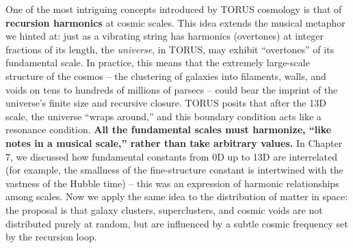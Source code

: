 \documentclass[
]{article}
\begin{document}
One of the most intriguing concepts introduced by TORUS cosmology is
that of \textbf{recursion harmonics} at cosmic scales. This idea extends
the musical metaphor we hinted at: just as a vibrating string has
harmonics (overtones) at integer fractions of its length, the
\emph{universe}, in TORUS, may exhibit ``overtones'' of its fundamental
scale. In practice, this means that the extremely large-scale structure
of the cosmos -- the clustering of galaxies into filaments, walls, and
voids on tens to hundreds of millions of parsecs -- could bear the
imprint of the universe's finite size and recursive closure. TORUS
posits that after the 13D scale, the universe ``wraps around,'' and this
boundary condition acts like a resonance condition. \textbf{All the
fundamental scales must harmonize, ``like notes in a musical scale,''
rather than take arbitrary values\hspace{0pt}.} In Chapter 7, we
discussed how fundamental constants from 0D up to 13D are interrelated
(for example, the smallness of the fine-structure constant \alpha is
intertwined with the vastness of the Hubble time) -- this was an
expression of harmonic relationships among scales. Now we apply the same
idea to the distribution of matter in space: the proposal is that galaxy
clusters, superclusters, and cosmic voids are not distributed purely at
random, but are influenced by a subtle cosmic frequency set by the
recursion loop.
\end{document}
